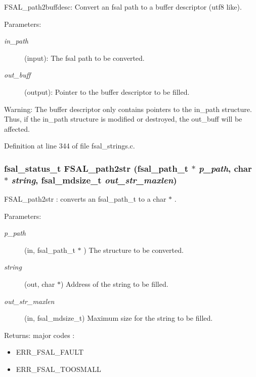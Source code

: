 FSAL\_\-path2buffdesc: Convert an fsal path to a buffer descriptor (utf8 like).

\begin{Desc}
\item[Parameters:]
\begin{description}
\item[{\em in\_\-path}](input): The fsal path to be converted. \item[{\em out\_\-buff}](output): Pointer to the buffer descriptor to be filled.\end{description}
\end{Desc}
\begin{Desc}
\item[Warning:]The buffer descriptor only contains pointers to the in\_\-path structure. Thus, if the in\_\-path structure is modified or destroyed, the out\_\-buff will be affected. \end{Desc}


Definition at line 344 of file fsal\_\-strings.c.
\subsubsection{\setlength{\rightskip}{0pt plus 5cm}fsal\_\-status\_\-t FSAL\_\-path2str (fsal\_\-path\_\-t $\ast$ {\em p\_\-path}, char $\ast$ {\em string}, fsal\_\-mdsize\_\-t {\em out\_\-str\_\-maxlen})}\label{group__FSALNameFunctions_ga3}


FSAL\_\-path2str : converts an fsal\_\-path\_\-t to a char $\ast$ .

\begin{Desc}
\item[Parameters:]
\begin{description}
\item[{\em p\_\-path}](in, fsal\_\-path\_\-t $\ast$ ) The structure to be converted. \item[{\em string}](out, char $\ast$) Address of the string to be filled. \item[{\em out\_\-str\_\-maxlen}](in, fsal\_\-mdsize\_\-t) Maximum size for the string to be filled.\end{description}
\end{Desc}
\begin{Desc}
\item[Returns:]major codes :\begin{itemize}
\item ERR\_\-FSAL\_\-FAULT\item ERR\_\-FSAL\_\-TOOSMALL \end{itemize}
\end{Desc}


